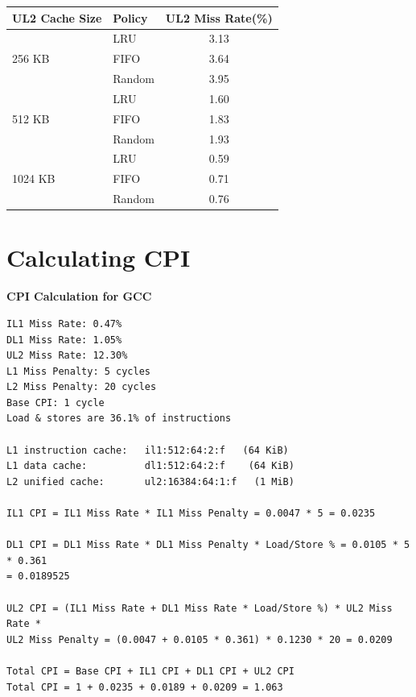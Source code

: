 \documentclass[twocolumn]{article}
\begin{document}
\begingroup
    \medskip
    \centering
    \def\arraystretch{1.5}
        \scriptsize{
        \begin{tabular}{llc}
            \toprule
            UL2 Cache Size & Policy & UL2 Miss Rate(\%) \\
             \midrule
            & LRU & 3.13\\
            256 KB & FIFO & 3.64\\
            & Random & 3.95\\
            \midrule
            & LRU & 1.60\\
            512 KB & FIFO & 1.83\\
            & Random & 1.93\\
            \midrule
            & LRU & 0.59\\
            1024 KB & FIFO & 0.71\\
            & Random & 0.76 \\
            \bottomrule
        \end{tabular}
        }
    \label{fig:noOptimization}
    \medskip
\endgroup

\section{Calculating CPI}

\bigskip

\textbf{CPI Calculation for GCC}
\begin{lstlisting}
IL1 Miss Rate: 0.47%
DL1 Miss Rate: 1.05%
UL2 Miss Rate: 12.30%
L1 Miss Penalty: 5 cycles
L2 Miss Penalty: 20 cycles
Base CPI: 1 cycle
Load & stores are 36.1% of instructions

L1 instruction cache:   il1:512:64:2:f   (64 KiB)
L1 data cache:          dl1:512:64:2:f    (64 KiB)
L2 unified cache:       ul2:16384:64:1:f   (1 MiB)

IL1 CPI = IL1 Miss Rate * IL1 Miss Penalty = 0.0047 * 5 = 0.0235

DL1 CPI = DL1 Miss Rate * DL1 Miss Penalty * Load/Store % = 0.0105 * 5 * 0.361
= 0.0189525

UL2 CPI = (IL1 Miss Rate + DL1 Miss Rate * Load/Store %) * UL2 Miss Rate * 
UL2 Miss Penalty = (0.0047 + 0.0105 * 0.361) * 0.1230 * 20 = 0.0209

Total CPI = Base CPI + IL1 CPI + DL1 CPI + UL2 CPI
Total CPI = 1 + 0.0235 + 0.0189 + 0.0209 = 1.063
\end{lstlisting}
\bigskip
\bigskip
\end{document}
